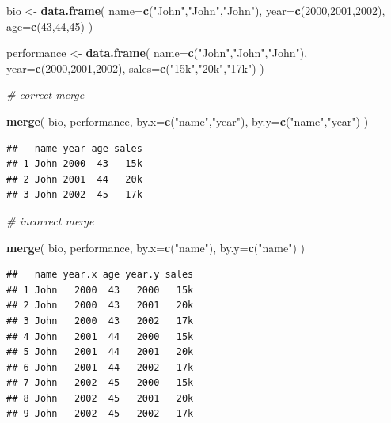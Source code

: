 \documentclass[]{book}
\newenvironment{Shaded}{\begin{snugshade}}{\end{snugshade}}
\newcommand{\CommentTok}[1]{\textcolor[rgb]{0.56,0.35,0.01}{\textit{#1}}}
\newcommand{\DataTypeTok}[1]{\textcolor[rgb]{0.13,0.29,0.53}{#1}}
\newcommand{\DecValTok}[1]{\textcolor[rgb]{0.00,0.00,0.81}{#1}}
\newcommand{\KeywordTok}[1]{\textcolor[rgb]{0.13,0.29,0.53}{\textbf{#1}}}
\newcommand{\NormalTok}[1]{#1}
\newcommand{\StringTok}[1]{\textcolor[rgb]{0.31,0.60,0.02}{#1}}
\theoremstyle{definition}
\theoremstyle{definition}
\theoremstyle{definition}
\theoremstyle{remark}
\begin{document}
\begin{Shaded}
\begin{Highlighting}[]
\NormalTok{bio <-}\StringTok{ }\KeywordTok{data.frame}\NormalTok{( }\DataTypeTok{name=}\KeywordTok{c}\NormalTok{(}\StringTok{"John"}\NormalTok{,}\StringTok{"John"}\NormalTok{,}\StringTok{"John"}\NormalTok{),}
                   \DataTypeTok{year=}\KeywordTok{c}\NormalTok{(}\DecValTok{2000}\NormalTok{,}\DecValTok{2001}\NormalTok{,}\DecValTok{2002}\NormalTok{),}
                   \DataTypeTok{age=}\KeywordTok{c}\NormalTok{(}\DecValTok{43}\NormalTok{,}\DecValTok{44}\NormalTok{,}\DecValTok{45}\NormalTok{) )}

\NormalTok{performance <-}\StringTok{ }\KeywordTok{data.frame}\NormalTok{( }\DataTypeTok{name=}\KeywordTok{c}\NormalTok{(}\StringTok{"John"}\NormalTok{,}\StringTok{"John"}\NormalTok{,}\StringTok{"John"}\NormalTok{),}
                           \DataTypeTok{year=}\KeywordTok{c}\NormalTok{(}\DecValTok{2000}\NormalTok{,}\DecValTok{2001}\NormalTok{,}\DecValTok{2002}\NormalTok{),}
                           \DataTypeTok{sales=}\KeywordTok{c}\NormalTok{(}\StringTok{"15k"}\NormalTok{,}\StringTok{"20k"}\NormalTok{,}\StringTok{"17k"}\NormalTok{) )}

\CommentTok{# correct merge}

\KeywordTok{merge}\NormalTok{( bio, performance, }\DataTypeTok{by.x=}\KeywordTok{c}\NormalTok{(}\StringTok{"name"}\NormalTok{,}\StringTok{"year"}\NormalTok{), }\DataTypeTok{by.y=}\KeywordTok{c}\NormalTok{(}\StringTok{"name"}\NormalTok{,}\StringTok{"year"}\NormalTok{) ) }
\end{Highlighting}
\end{Shaded}

\begin{verbatim}
##   name year age sales
## 1 John 2000  43   15k
## 2 John 2001  44   20k
## 3 John 2002  45   17k
\end{verbatim}

\begin{Shaded}
\begin{Highlighting}[]
\CommentTok{# incorrect merge}

\KeywordTok{merge}\NormalTok{( bio, performance, }\DataTypeTok{by.x=}\KeywordTok{c}\NormalTok{(}\StringTok{"name"}\NormalTok{), }\DataTypeTok{by.y=}\KeywordTok{c}\NormalTok{(}\StringTok{"name"}\NormalTok{) )  }
\end{Highlighting}
\end{Shaded}

\begin{verbatim}
##   name year.x age year.y sales
## 1 John   2000  43   2000   15k
## 2 John   2000  43   2001   20k
## 3 John   2000  43   2002   17k
## 4 John   2001  44   2000   15k
## 5 John   2001  44   2001   20k
## 6 John   2001  44   2002   17k
## 7 John   2002  45   2000   15k
## 8 John   2002  45   2001   20k
## 9 John   2002  45   2002   17k
\end{verbatim}
\end{document}
